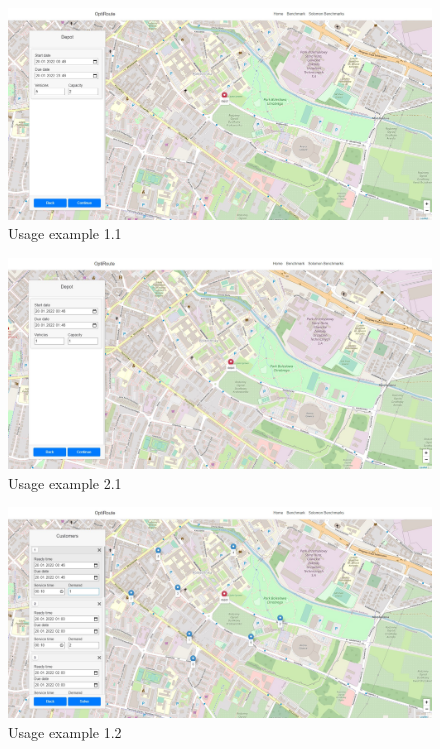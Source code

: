 \documentclass[a4paper,twoside,12pt]{book}
\begin{document}
\begin{figure}[H]
\centering
\includegraphics[scale=0.3]{images/depotScenario1.jpg}
\caption{Usage example 1.1}
\label{fig:depotScenario1}
\end{figure}

\begin{figure}[H]
\centering
\includegraphics[scale=0.3]{images/depotScenario2.jpg}
\caption{Usage example 2.1}
\label{fig:depotScenario2}
\end{figure}

\begin{figure}[H]
\centering
\includegraphics[scale=0.3]{images/customersScenario1.jpg}
\caption{Usage example 1.2}
\label{fig:customersScenario1}
\end{figure}
\end{document}
